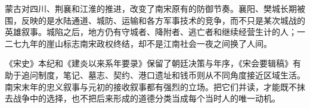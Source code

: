蒙古对四川、荆襄和江淮的推进，改变了南宋原有的防御节奏。襄阳、樊城长期被围，反映的是水陆通道、城防、运输和各方军事技术的竞争，而不只是某次城战的英雄叙事。城陷之后，地方仍有守城者、降附者、逃亡者和继续经营生计的人；一二七九年的崖山标志南宋政权终结，却不是江南社会一夜之间换了人间。

《宋史》本纪和《建炎以来系年要录》保留了朝廷决策与年序，《宋会要辑稿》有助于追问制度，笔记、墓志、契约、港口遗址和钱币则从不同角度接近区域生活。南宋末年的忠义叙事与元初的接收叙事都有强烈的立场。把它们并读，才能既不抹去战争中的选择，也不把后来形成的道德分类当成每个当时人的唯一动机。


















